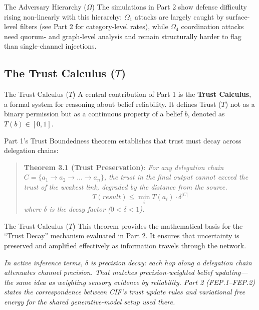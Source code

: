 \documentclass[
  ignorenonframetext,
]{beamer}
\begin{document}
\begin{frame}[allowframebreaks]{The Adversary Hierarchy (\(\Omega\))}
The simulations in Part 2 show defense difficulty rising non-linearly
with this hierarchy: \(\Omega_1\) attacks are largely caught by
surface-level filters (see Part 2 for category-level rates), while
\(\Omega_4\) coordination attacks need quorum- and graph-level analysis
and remain structurally harder to flag than single-channel injections.
\end{frame}

\subsection{\texorpdfstring{The Trust Calculus
(\(T\))}{The Trust Calculus (T)}}\label{sec:trust-calculus-review}

\begin{frame}[allowframebreaks]{The Trust Calculus (\(T\))}
A central contribution of Part 1 is the \textbf{Trust Calculus}, a
formal system for reasoning about belief reliability. It defines Trust
(\(T\)) not as a binary permission but as a continuous property of a
belief \(b\), denoted as \(T(b) \in [0, 1]\).

Part 1's Trust Boundedness theorem establishes that trust must decay
across delegation chains:

\begin{quote}
\textbf{Theorem 3.1 (Trust Preservation)}: \emph{For any delegation
chain \(C = \{a_1 \to a_2 \to \dots \to a_n\}\), the trust in the final
output cannot exceed the trust of the weakest link, degraded by the
distance from the source.}
\[ T(result) \le \min_{i} T(a_i) \cdot \delta^{\lvert C\rvert} \]
\emph{where \(\delta\) is the decay factor (\(0 < \delta < 1\)).}
\end{quote}

\end{frame}

\begin{frame}[allowframebreaks]{The Trust Calculus (\(T\))}
This theorem provides the mathematical basis for the ``Trust Decay''
mechanism evaluated in Part 2. It ensures that uncertainty is preserved
and amplified effectively as information travels through the network.

\emph{In active inference terms, \(\delta\) is precision decay: each hop
along a delegation chain attenuates channel precision. That matches
precision-weighted belief updating---the same idea as weighting sensory
evidence by reliability. Part 2 (FEP.1--FEP.2) states the correspondence
between CIF's trust update rules and variational free energy for the
shared generative-model setup used there.}
\end{frame}
\end{document}
